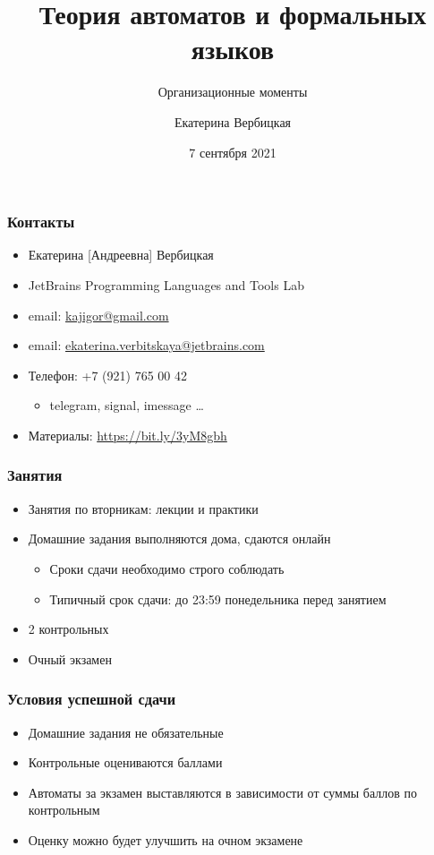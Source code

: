 \documentclass{beamer}
\title[]{Теория автоматов и формальных языков}
\subtitle[]{Организационные моменты}
\institute[]{
Санкт-Петербургский государственный электротехнический университет <<ЛЭТИ>>\\
}
\author[]{Екатерина Вербицкая}
\date{7 сентября 2021}
\begin{document}
{
\begin{frame}
  \titlepage
\end{frame}

}

\begin{frame}[fragile]
  \transwipe[direction=90]
  \frametitle{Контакты}
  \begin{itemize}
    \item Екатерина [Андреевна] Вербицкая
    \item JetBrains Programming Languages and Tools Lab
    \item email: \href{mailto:kajigor@gmail.com}{kajigor@gmail.com}
    \item email: \href{mailto:ekaterina.verbitskaya@jetbrains.com}{ekaterina.verbitskaya@jetbrains.com}
    \item Телефон: +7 (921) 765 00 42
    \begin{itemize}
      \item telegram, signal, imessage \dots
    \end{itemize}
    \item Материалы: \url{https://bit.ly/3yM8gbh}
  \end{itemize}
\end{frame}

\begin{frame}[fragile]
  \transwipe[direction=90]
  \frametitle{Занятия}
  \begin{itemize}
    \item Занятия по вторникам: лекции и практики
    \item Домашние задания выполняются дома, сдаются онлайн
    \begin{itemize}
      \item Сроки сдачи необходимо строго соблюдать
      \item Типичный срок сдачи: до 23:59 понедельника перед занятием
    \end{itemize}
    \item 2 контрольных
    \item Очный экзамен
  \end{itemize}
\end{frame}

\begin{frame}[fragile]
  \transwipe[direction=90]
  \frametitle{Условия успешной сдачи}
  \begin{itemize}
    \item Домашние задания не обязательные
    \item Контрольные оцениваются баллами
    \item Автоматы за экзамен выставляются в зависимости от суммы баллов по контрольным
  \end{itemize}
  \begin{itemize}
    \item Оценку можно будет улучшить на очном экзамене
  \end{itemize}
\end{frame}
\end{document}
